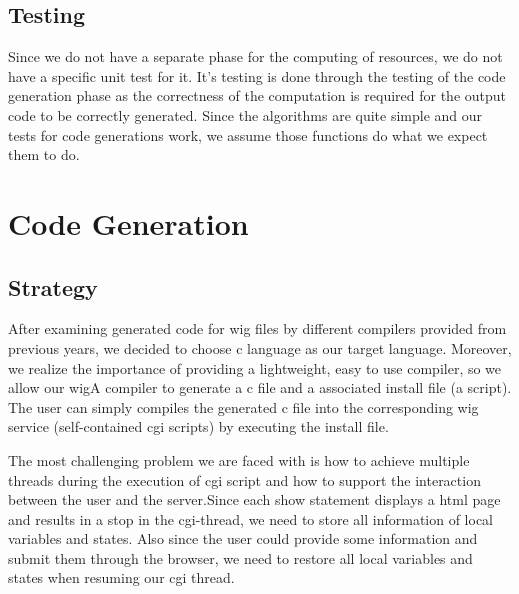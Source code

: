 \documentclass{WigReport}
\begin{document}
\subsection{Testing}
Since we do not have a separate phase for the computing of resources, we do not have a specific unit test for it. It's testing is done through the testing of the code generation phase as the correctness of the computation is required for the output code to be correctly generated. Since the algorithms are quite simple and our tests for code generations work, we assume those functions do what we expect them to do.

\section{Code Generation}
\subsection{Strategy}
After examining generated code for wig files by different compilers provided from previous years, we decided to choose c language as our target language. Moreover, we realize the importance of providing a lightweight, easy to use compiler, so we allow our wigA compiler to generate a c file and a associated install file (a script). The user can simply compiles the generated c file into the corresponding wig service (self-contained cgi scripts) by executing the install file.

The most challenging problem we are faced with is how to achieve multiple threads during the execution of cgi script and how to support the interaction between the user and the server.Since each show statement displays a html page and results in a stop in the cgi-thread, we need to store all information of local variables and states. Also since the user could provide some information and submit them through the browser, we need to restore all local variables and states when resuming our cgi thread. 
\end{document}

